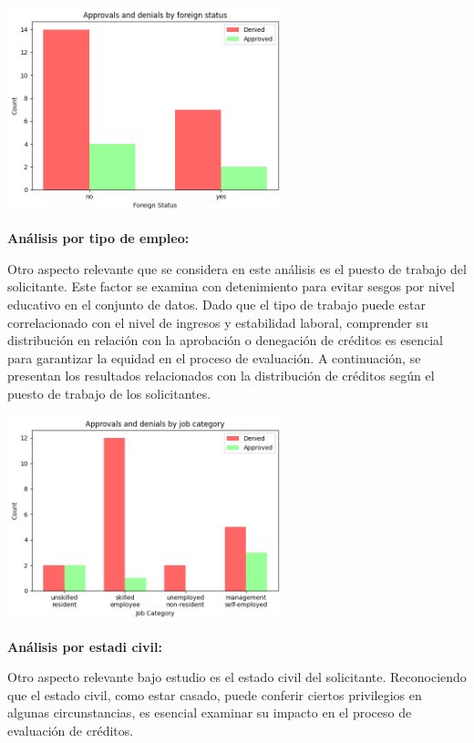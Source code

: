 \documentclass{article}
\begin{document}
\begin{multicols}{2}
\begin{center} %
    \includegraphics[width=8cm]{tex/media/foreign.png} 
\end{center}

\vspace{0.5cm}
\textbf{Análisis por tipo de empleo:}

Otro aspecto relevante que se considera en este análisis es el puesto de trabajo del solicitante. Este factor se examina con detenimiento para evitar sesgos por nivel educativo en el conjunto de datos. Dado que el tipo de trabajo puede estar correlacionado con el nivel de ingresos y estabilidad laboral, comprender su distribución en relación con la aprobación o denegación de créditos es esencial para garantizar la equidad en el proceso de evaluación. A continuación, se presentan los resultados relacionados con la distribución de créditos según el puesto de trabajo de los solicitantes.


\begin{center} %
    \includegraphics[width=8cm]{tex/media/jobs.png} 
\end{center}

\vspace{0.5cm}
\textbf{Análisis por estadi civil:}

Otro aspecto relevante bajo estudio es el estado civil del solicitante. Reconociendo que el estado civil, como estar casado, puede conferir ciertos privilegios en algunas circunstancias, es esencial examinar su impacto en el proceso de evaluación de créditos. 


\end{multicols}
\end{document}
